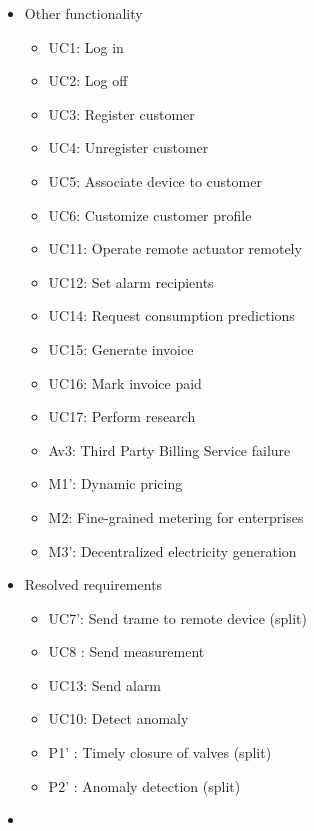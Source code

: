 \begin{itemize}
\begin{itemize}
	\end{itemize}
	\item Other functionality
	\begin{itemize}
	  	\item UC1: Log in
	  	\item UC2: Log off
	  	\item UC3: Register customer
	  	\item UC4: Unregister customer
	  	\item UC5: Associate device to customer
	  	\item UC6: Customize customer profile
	  	\item UC11: Operate remote actuator remotely
	  	\item UC12: Set alarm recipients
	  	\item UC14: Request consumption predictions
	  	\item UC15: Generate invoice
	  	\item UC16: Mark invoice paid
	  	\item UC17: Perform research
	  	\item Av3: Third Party Billing Service failure
	  	\item M1': Dynamic pricing
	  	\item M2: Fine-grained metering for enterprises
	  	\item M3': Decentralized electricity generation
	\end{itemize}
	\item Resolved requirements
	\begin{itemize}
		\item UC7': Send trame to remote device (split)
		\item UC8 : Send measurement
		\item UC13: Send alarm
		\item UC10: Detect anomaly
		\item P1' : Timely closure of valves (split)
		\item P2' : Anomaly detection (split)
	\end{itemize}
	\item 
\end{itemize}
